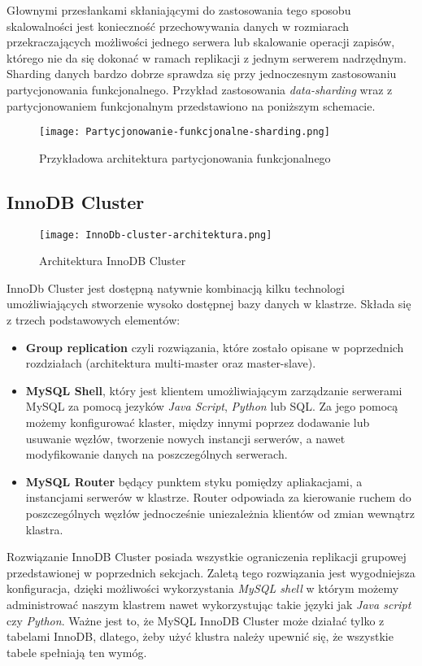 Głownymi przesłankami skłaniającymi do zastosowania tego sposobu skalowalności jest konieczność przechowywania danych w rozmiarach przekraczających możliwości jednego serwera lub skalowanie operacji zapisów, którego nie da się dokonać w ramach replikacji z jednym serwerem nadrzędnym. Sharding danych bardzo dobrze sprawdza się przy jednoczesnym zastosowaniu partycjonowania funkcjonalnego. Przykład zastosowania \textit{data-sharding} wraz z partycjonowaniem funkcjonalnym przedstawiono na poniższym schemacie.

\begin{figure}[!h]
	\centering
	\texttt{[image: Partycjonowanie-funkcjonalne-sharding.png]}
	\caption{Przykładowa architektura partycjonowania funkcjonalnego}
	\label{fig:label}
\end{figure}


\subsection{InnoDB Cluster}

\begin{figure}[!h]
	\centering
	\texttt{[image: InnoDb-cluster-architektura.png]}
	\caption{Architektura InnoDB Cluster}
	\label{fig:label}
\end{figure}
InnoDb Cluster jest dostępną natywnie kombinacją kilku technologi umożliwiających stworzenie wysoko dostępnej bazy danych w klastrze. Składa się z trzech podstawowych elementów:
\begin{itemize}
	\item \textbf{Group replication} czyli rozwiązania, które zostało opisane w poprzednich rozdziałach (architektura multi-master oraz master-slave).
	\item \textbf{MySQL Shell}, który jest klientem umożliwiającym zarządzanie serwerami MySQL za pomocą jezyków \textit{Java Script}, \textit{Python} lub SQL. Za jego pomocą możemy konfigurować klaster, między innymi poprzez dodawanie lub usuwanie węzłów, tworzenie nowych instancji serwerów, a nawet modyfikowanie danych na poszczególnych serwerach.
	\item \textbf{MySQL Router} będący punktem styku pomiędzy apliakacjami, a instancjami serwerów w klastrze. Router odpowiada za kierowanie ruchem do poszczególnych węzłów jednocześnie uniezależnia klientów od zmian wewnątrz klastra. 
\end{itemize}

Rozwiązanie InnoDB Cluster posiada wszystkie ograniczenia replikacji grupowej przedstawionej w poprzednich sekcjach. Zaletą tego rozwiązania jest wygodniejsza konfiguracja, dzięki możliwości wykorzystania \textit{MySQL shell} w którym możemy administrować naszym klastrem nawet wykorzystując takie języki jak \textit{Java script} czy \textit{Python}. Ważne jest to, że MySQL InnoDB Cluster może działać tylko z tabelami InnoDB, dlatego, żeby użyć klustra należy upewnić się, że wszystkie tabele spełniają ten wymóg.


